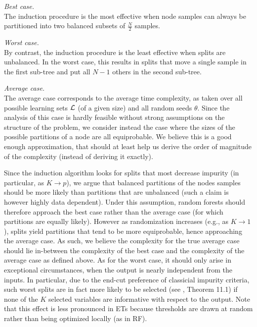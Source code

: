 \begin{description}
\item \textit{Best case.}\hfill\\
      The induction procedure is the most effective
      when node samples can always be partitioned into two balanced subsets of $\tfrac{N}{2}$
      samples.

\item \textit{Worst case.}\hfill\\
      By contrast, the induction procedure is the least
      effective when splits are unbalanced. In the worst case,
      this results in splits that move a single sample in the first sub-tree and
      put all $N-1$ others in the second sub-tree.

\item \textit{Average case.}\hfill\\
      The average case corresponds to the average time
      complexity, as taken over all possible learning sets ${\cal L}$ (of a given size) and
      all random seeds $\theta$.  Since the analysis of this case is hardly
      feasible without strong assumptions on the structure of the problem,
      we consider instead the case where the sizes of the possible
      partitions of a node are all equiprobable. We believe this is a good
      enough approximation, that should at least help us derive the order
      of magnitude of the complexity (instead of deriving it exactly).

\end{description}

Since the induction algorithm looks for splits that most decrease impurity (in
particular, as $K\to p$), we argue that balanced partitions of the nodes
samples should  be more likely than partitions that are unbalanced (such a
claim is however highly data dependent). Under this assumption, random forests should
therefore approach the best case rather than the average case (for which
partitions are equally likely). However as randomization increases (e.g., as $K
\to 1$), splits yield partitions that tend to be more equiprobable, hence
approaching the average case. As such, we believe the complexity for the true
average case should lie in-between the complexity of the best case and the
complexity of the average case as defined above. As for the worst case, it
should only arise in exceptional circumstances, when the output is nearly
independent from the inputs. In particular, due to the end-cut preference of
classicial impurity criteria, such worst splits are in fact more likely to be
selected (see \citep{breiman:1984}, Theorem 11.1) if none of the $K$ selected
variables are informative with respect to the output. Note that this effect is
less pronounced in ETs because thresholds are drawn at random rather than being
optimized locally (as in RF).


